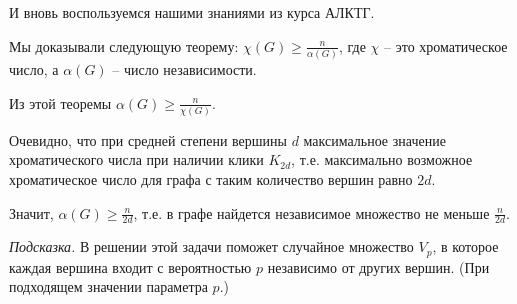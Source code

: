 \documentclass[12pt]{extreport}
\theoremstyle{definiton}
\theoremstyle{definition}
\theoremstyle{definition}
\let\geq\geqslant
\begin{document}
		И вновь воспользуемся нашими знаниями из курса АЛКТГ.

		Мы доказывали следующую теорему: $\chi (G) \geq \frac{n}{\alpha(G)}$, где $\chi$ -- это хроматическое число, а $\alpha(G)$ -- число независимости.

		Из этой теоремы $\alpha (G) \geq \frac{n}{\chi(G)}$.

		Очевидно, что при средней степени вершины $d$ максимальное значение хроматического числа при наличии клики $K_{2d}$, т.е. максимально возможное хроматическое число для графа с таким количество вершин равно $2d$. 
		
		Значит, $\alpha (G) \geq \frac{n}{2d}$, т.е. в графе найдется независимое множество не меньше $\frac{n}{2d}$.

	\textsl{Подсказка.} В решении этой задачи поможет случайное множество
	$V_p$, в которое каждая вершина входит с вероятностью $p$ независимо
	от других вершин. (При подходящем значении параметра $p$.)
\end{document}
